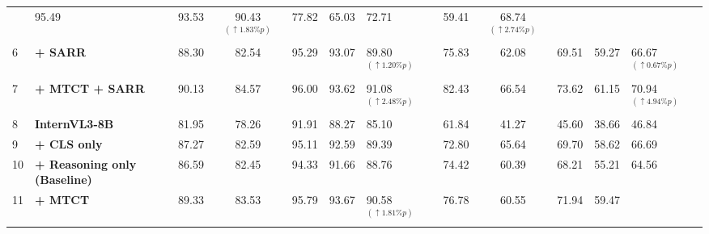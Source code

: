 \begin{table}[t]
\begin{center}
{\begin{tabular}{l|lcccclccccl}
& {\color[HTML]{F56B00} 95.49}
& {\color[HTML]{F56B00} 93.53}
& {\color[HTML]{F56B00} 90.43$^{(\uparrow1.83\%p)}$}
& {\color[HTML]{F56B00} 77.82}
& {\color[HTML]{F56B00} 65.03}
& {\color[HTML]{F56B00} 72.71}
& {\color[HTML]{F56B00} 59.41}
& {\color[HTML]{F56B00} 68.74$^{(\uparrow2.74\%p)}$} \\
6
& {\color[HTML]{F56B00}
\textbf{+ SARR}}
& {\color[HTML]{F56B00} 88.30}
& {\color[HTML]{F56B00} 82.54}
& {\color[HTML]{F56B00} 95.29}
& {\color[HTML]{F56B00} 93.07}
& {\color[HTML]{F56B00} 89.80$^{(\uparrow1.20\%p)}$}
& {\color[HTML]{F56B00} 75.83}
& {\color[HTML]{F56B00} 62.08}
& {\color[HTML]{F56B00} 69.51}
& {\color[HTML]{F56B00} 59.27}
& {\color[HTML]{F56B00} 66.67$^{(\uparrow0.67\%p)}$} \\
7
& {\color[HTML]{009901}
\textbf{+ MTCT + SARR}}
& {\color[HTML]{009901} 90.13}
& {\color[HTML]{009901} 84.57}
& {\color[HTML]{009901} 96.00}
& {\color[HTML]{009901} 93.62}
& {\color[HTML]{009901} 91.08$^{(\uparrow2.48\%p)}$}
& {\color[HTML]{009901} 82.43}
& {\color[HTML]{009901} 66.54}
& {\color[HTML]{009901} 73.62}
& {\color[HTML]{009901} 61.15}
& {\color[HTML]{009901} 70.94$^{(\uparrow4.94\%p)}$} \\
\addlinespace[0.6mm] \hline \addlinespace[0.6mm]
\rowcolor[HTML]{ECF4FF}
8
& \textbf{InternVL3-8B}
& 81.95 & 78.26 & 91.91 & 88.27 & 85.10
& 61.84 & 41.27 & 45.60 & 38.66 & 46.84 \\
9
& {\color[HTML]{9B9B9B}
\textbf{+ CLS only}}
& {\color[HTML]{9B9B9B} 87.27}
& {\color[HTML]{9B9B9B} 82.59}
& {\color[HTML]{9B9B9B} 95.11}
& {\color[HTML]{9B9B9B} 92.59}
& {\color[HTML]{9B9B9B} 89.39}
& {\color[HTML]{9B9B9B} 72.80}
& {\color[HTML]{9B9B9B} 65.64}
& {\color[HTML]{9B9B9B} 69.70}
& {\color[HTML]{9B9B9B} 58.62}
& {\color[HTML]{9B9B9B} 66.69} \\
10
& {\color[HTML]{9B9B9B}
\textbf{+ Reasoning only (Baseline)}}
& {\color[HTML]{9B9B9B} 86.59}
& {\color[HTML]{9B9B9B} 82.45}
& {\color[HTML]{9B9B9B} 94.33}
& {\color[HTML]{9B9B9B} 91.66}
& {\color[HTML]{9B9B9B} 88.76}
& {\color[HTML]{9B9B9B} 74.42}
& {\color[HTML]{9B9B9B} 60.39}
& {\color[HTML]{9B9B9B} 68.21}
& {\color[HTML]{9B9B9B} 55.21}
& {\color[HTML]{9B9B9B} 64.56} \\
11
& {\color[HTML]{F56B00}
\textbf{+ MTCT}}
& {\color[HTML]{F56B00} 89.33}
& {\color[HTML]{F56B00} 83.53}
& {\color[HTML]{F56B00} 95.79}
& {\color[HTML]{F56B00} 93.67}
& {\color[HTML]{F56B00} 90.58$^{(\uparrow1.81\%p)}$}
& {\color[HTML]{F56B00} 76.78}
& {\color[HTML]{F56B00} 60.55}
& {\color[HTML]{F56B00} 71.94}
& {\color[HTML]{F56B00} 59.47}

\end{tabular}}
\end{center}
\end{table}

